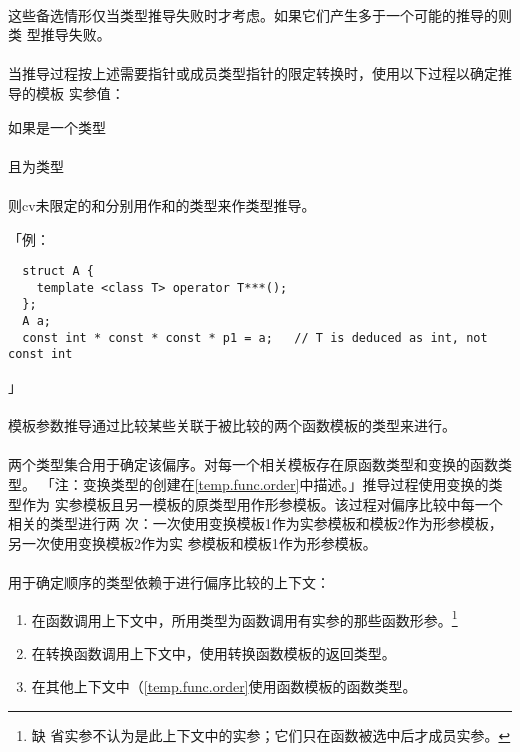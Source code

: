 \paragraph{}
这些备选情形仅当类型推导失败时才考虑。如果它们产生多于一个可能的推导的则类
型推导失败。

\paragraph{}
当推导过程按上述需要指针或成员类型指针的限定转换时，使用以下过程以确定推导的模板
实参值：

如果是一个类型 \\
\mbox{} \\
且为类型 \\
\mbox{} \\
则cv未限定的和分别用作和的类型来作类型推导。

「例：
\begin{lstlisting}
  struct A {
    template <class T> operator T***();
  };
  A a;
  const int * const * const * p1 = a;   // T is deduced as int, not const int
\end{lstlisting}」

\paragraph{}
模板参数推导通过比较某些关联于被比较的两个函数模板的类型来进行。

\paragraph{}
两个类型集合用于确定该偏序。对每一个相关模板存在原函数类型和变换的函数类型。
「注：变换类型的创建在\ref{temp.func.order}中描述。」推导过程使用变换的类型作为
实参模板且另一模板的原类型用作形参模板。该过程对偏序比较中每一个相关的类型进行两
次：一次使用变换模板1作为实参模板和模板2作为形参模板，另一次使用变换模板2作为实
参模板和模板1作为形参模板。

\paragraph{}
用于确定顺序的类型依赖于进行偏序比较的上下文：
\begin{enumerate}
  \item{在函数调用上下文中，所用类型为函数调用有实参的那些函数形参。\footnote{缺
    省实参不认为是此上下文中的实参；它们只在函数被选中后才成员实参。}}
  \item{在转换函数调用上下文中，使用转换函数模板的返回类型。}
  \item{在其他上下文中（\ref{temp.func.order}使用函数模板的函数类型。}
\end{enumerate}

